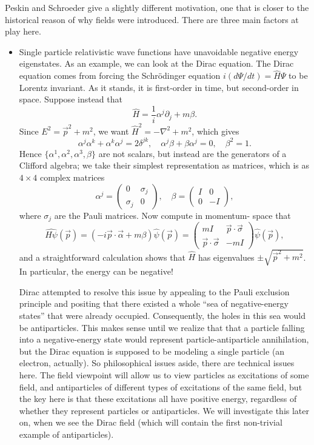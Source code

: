 \documentclass{report}
\theoremstyle{plain}
\theoremstyle{definition}
\theoremstyle{remark}
\begin{document}
Peskin and Schroeder give a slightly different motivation, one that is
closer to the historical reason of why fields were introduced. There
are three main factors at play here.
\begin{itemize}
\item
  Single particle relativistic wave functions have unavoidable
  negative energy eigenstates. As an example, we can look at the Dirac
  equation. The Dirac equation comes from forcing the Schr\"odinger
  equation $i(d\Psi/dt) = \hat{H}\Psi$ to be Lorentz invariant. As it
  stands, it is first-order in time, but second-order in space.
  Suppose instead that
  $$ \hat{H} = \frac{1}{i} \alpha^j \partial_j + m\beta. $$
  Since $E^2 = \vec{p}^2 + m^2$, we want $\hat{H}^2 = -\nabla^2 + m^2$,
  which gives
  $$ \alpha^j \alpha^k + \alpha^k \alpha^j = 2\delta^{jk}, \quad
  \alpha^j \beta + \beta \alpha^j = 0, \quad \beta^2 = 1. $$
  Hence $\{\alpha^1, \alpha^2, \alpha^3, \beta\}$ are not scalars, but
  instead are the generators of a Clifford algebra; we take their
  simplest representation as matrices, which is as $4 \times 4$
  complex matrices
  $$ \alpha^j = \begin{pmatrix} 0 & \sigma_j \\ \sigma_j &
    0 \end{pmatrix}, \quad \beta = \begin{pmatrix} I & 0 \\ 0 &
    -I \end{pmatrix}, $$
  where $\sigma_j$ are the Pauli matrices. Now compute in momentum-
  space that
  $$ \widehat{H\psi}(\vec{p}) = (-i \vec{p} \cdot \vec{\alpha} +
  m\beta) \hat{\psi}(\vec{p}) = \begin{pmatrix} mI & \vec{p} \cdot
    \vec{\sigma} \\ \vec{p} \cdot \vec{\sigma} & -mI \end{pmatrix}
  \hat{\psi}(\vec{p}), $$
  and a straightforward calculation shows that $\hat{H}$ has
  eigenvalues $\pm \sqrt{\vec{p}^2 + m^2}$. In particular, the energy
  can be negative!

  Dirac attempted to resolve this issue by appealing to the Pauli
  exclusion principle and positing that there existed a whole ``sea of
  negative-energy states'' that were already occupied. Consequently,
  the holes in this sea would be antiparticles. This makes sense until
  we realize that that a particle falling into a negative-energy state
  would represent particle-antiparticle annihilation, but the Dirac
  equation is supposed to be modeling a single particle (an electron,
  actually). So philosophical issues aside, there are technical issues
  here. The field viewpoint will allow us to view particles as
  excitations of some field, and antiparticles of different types of
  excitations of the same field, but the key here is that these
  excitations all have positive energy, regardless of whether they
  represent particles or antiparticles. We will investigate this later
  on, when we see the Dirac field (which will contain the first
  non-trivial example of antiparticles).


\end{itemize}
\end{document}
